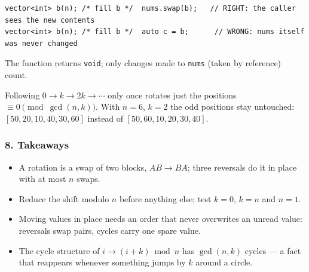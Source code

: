 \begin{warningbox}
\begin{lstlisting}[style=snippet]
vector<int> b(n); /* fill b */  nums.swap(b);   // RIGHT: the caller sees the new contents
vector<int> b(n); /* fill b */  auto c = b;      // WRONG: nums itself was never changed
\end{lstlisting}
The function returns \texttt{void}; only changes made to \texttt{nums} (taken by reference) count.
\end{warningbox}

\begin{warningbox}
Following $0 \to k \to 2k \to \cdots$ only once rotates just the positions $\equiv 0 \pmod{\gcd(n,k)}$. With $n = 6$, $k = 2$ the odd positions stay untouched: $[50,20,10,40,30,60]$ instead of $[50,60,10,20,30,40]$.
\end{warningbox}

\subsubsection*{8. Takeaways}

\begin{itemize}[leftmargin=*]
    \item A rotation is a swap of two blocks, $AB \to BA$; three reversals do it in place with at most $n$ swaps.
    \item Reduce the shift modulo $n$ before anything else; test $k = 0$, $k = n$ and $n = 1$.
    \item Moving values in place needs an order that never overwrites an unread value: reversals swap pairs, cycles carry one spare value.
    \item The cycle structure of $i \to (i+k) \bmod n$ has $\gcd(n,k)$ cycles --- a fact that reappears whenever something jumps by $k$ around a circle.
\end{itemize}


